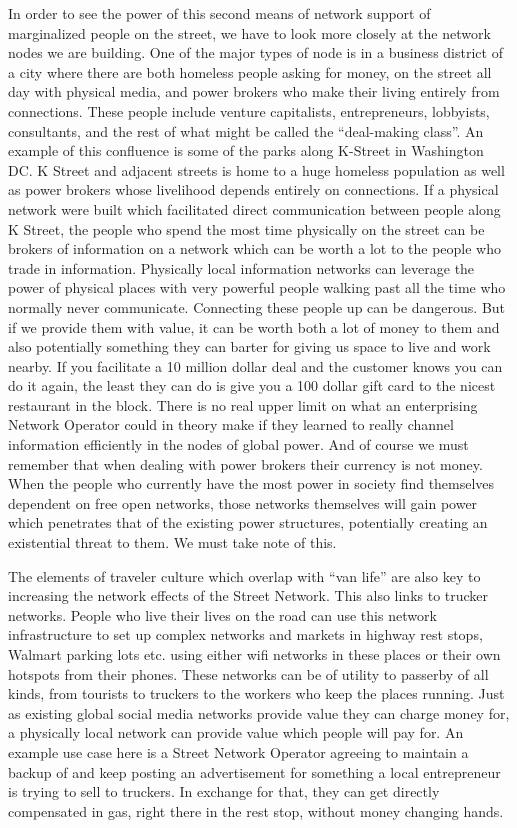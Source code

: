\documentclass{report}
\begin{document}
In order to see the power of this second means of network support of
marginalized people on the street, we have to look more closely at the
network nodes we are building. One of the major types of node is in a
business district of a city where there are both homeless people asking
for money, on the street all day with physical media, and power brokers
who make their living entirely from connections. These people include
venture capitalists, entrepreneurs, lobbyists, consultants, and the rest
of what might be called the ``deal-making class''. An example of this
confluence is some of the parks along K-Street in Washington DC. K
Street and adjacent streets is home to a huge homeless population as
well as power brokers whose livelihood depends entirely on connections.
If a physical network were built which facilitated direct communication
between people along K Street, the people who spend the most time
physically on the street can be brokers of information on a network
which can be worth a lot to the people who trade in information.
Physically local information networks can leverage the power of physical
places with very powerful people walking past all the time who normally
never communicate. Connecting these people up can be dangerous. But if
we provide them with value, it can be worth both a lot of money to them
and also potentially something they can barter for giving us space to
live and work nearby. If you facilitate a 10 million dollar deal and the
customer knows you can do it again, the least they can do is give you a
100 dollar gift card to the nicest restaurant in the block. There is no
real upper limit on what an enterprising Network Operator could in
theory make if they learned to really channel information efficiently in
the nodes of global power. And of course we must remember that when
dealing with power brokers their currency is not money. When the people
who currently have the most power in society find themselves dependent
on free open networks, those networks themselves will gain power which
penetrates that of the existing power structures, potentially creating
an existential threat to them. We must take note of this.

The elements of traveler culture which overlap with ``van life'' are
also key to increasing the network effects of the Street Network. This
also links to trucker networks. People who live their lives on the road
can use this network infrastructure to set up complex networks and
markets in highway rest stops, Walmart parking lots etc. using either
wifi networks in these places or their own hotspots from their phones.
These networks can be of utility to passerby of all kinds, from tourists
to truckers to the workers who keep the places running. Just as existing
global social media networks provide value they can charge money for, a
physically local network can provide value which people will pay for. An
example use case here is a Street Network Operator agreeing to maintain
a backup of and keep posting an advertisement for something a local
entrepreneur is trying to sell to truckers. In exchange for that, they
can get directly compensated in gas, right there in the rest stop,
without money changing hands.
\end{document}
